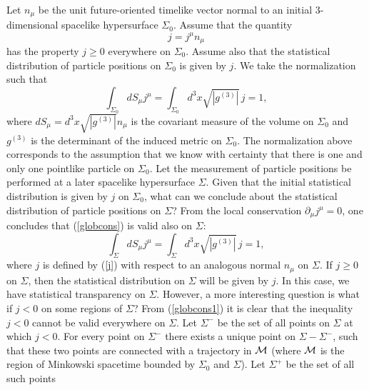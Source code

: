 \documentclass[12pt]{article}
\begin{document}
Let $n_{\mu}$ be the unit 
future-oriented timelike vector normal to 
an initial 3-dimensional spacelike
hypersurface $\Sigma_0$. Assume that the quantity 
\begin{equation}\label{j}
j=j^{\mu}n_{\mu}
\end{equation}
has the property $j\geq 0$
everywhere on $\Sigma_0$. 
%
%
Assume also                                                 
that the statistical distribution of particle positions on
$\Sigma_0$ is given by $j$.
We take the normalization such that
\begin{equation}\label{globcons}
\int_{\Sigma_0} dS_{\mu}j^{\mu}=
\int_{\Sigma_0} d^3x \sqrt{|g^{(3)}|}\, j =1,
\end{equation}
where $dS_{\mu}=d^3x \sqrt{|g^{(3)}|}n_{\mu}$ 
is the covariant measure of the volume 
on $\Sigma_0$ and $g^{(3)}$ is the determinant of the induced metric 
on $\Sigma_0$. 
The normalization above corresponds
to the assumption that we know with certainty that 
there is one and only one pointlike particle on $\Sigma_0$.
Let the measurement of particle 
positions be performed at a later spacelike hypersurface $\Sigma$.
Given that the initial statistical distribution is given by
$j$ on $\Sigma_0$, 
what can we conclude about the statistical distribution of particle
positions on $\Sigma$? From the local conservation 
$\partial_{\mu}j^{\mu}=0$, one concludes that (\ref{globcons}) 
is valid also on $\Sigma$:
\begin{equation}\label{globcons1}
\int_{\Sigma} dS_{\mu}j^{\mu}=  
\int_{\Sigma} d^3x \sqrt{|g^{(3)}|}\, j =1,
\end{equation}
where $j$ is defined by (\ref{j}) with respect to an analogous 
normal $n_{\mu}$ on $\Sigma$.
If $j\geq 0$ on $\Sigma$, then 
the statistical distribution on $\Sigma$ will be given by $j$. 
In this case, we have statistical transparency on $\Sigma$.
However, a more interesting question is what if 
$j<0$ on some regions of $\Sigma$?
From (\ref{globcons1})
it is clear that the inequality $j<0$ cannot be valid 
everywhere on $\Sigma$. Let $\Sigma^-$ be the set of all points 
on $\Sigma$ at which $j<0$.
For every point on $\Sigma^-$ there exists a unique point on 
$\Sigma-\Sigma^-$, such that these two points are connected with a 
trajectory in ${\cal M}$ (where ${\cal M}$ is the region of  
Minkowski spacetime bounded by $\Sigma_0$ and $\Sigma$). 
Let $\Sigma^+$ be the set of all such points 
\end{document}
